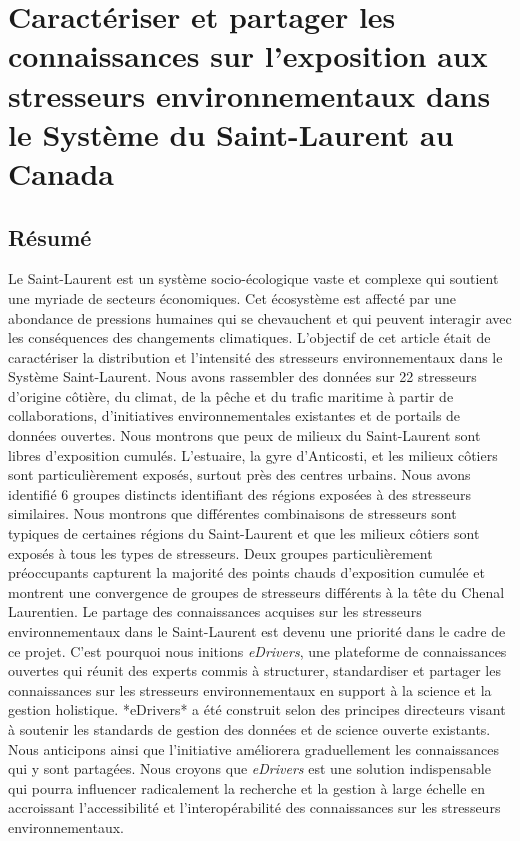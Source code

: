 \chapter{Caractériser et partager les connaissances sur l’exposition aux stresseurs environnementaux dans le Système du Saint-Laurent au Canada}
\label{chap4}

\section{Résumé}

Le Saint-Laurent est un système socio-écologique vaste et complexe qui soutient une myriade de secteurs économiques. Cet écosystème est affecté par une abondance de pressions humaines qui se chevauchent et qui peuvent interagir avec les conséquences des changements climatiques. L’objectif de cet article était de caractériser la distribution et l’intensité des stresseurs environnementaux dans le Système Saint-Laurent. Nous avons rassembler des données sur 22 stresseurs d’origine côtière, du climat, de la pêche et du trafic maritime à partir de collaborations, d’initiatives environnementales existantes et de portails de données ouvertes. Nous montrons que peux de milieux du Saint-Laurent sont libres d’exposition cumulés. L’estuaire, la gyre d’Anticosti, et les milieux côtiers sont particulièrement exposés, surtout près des centres urbains. Nous avons identifié 6 groupes distincts identifiant des régions exposées à des stresseurs similaires. Nous montrons que différentes combinaisons de stresseurs sont typiques de certaines régions du Saint-Laurent et que les milieux côtiers sont exposés à tous les types de stresseurs. Deux groupes particulièrement préoccupants capturent la majorité des points chauds d’exposition cumulée et montrent une convergence de groupes de stresseurs différents à la tête du Chenal Laurentien. Le partage des connaissances acquises sur les stresseurs environnementaux dans le Saint-Laurent est devenu une priorité dans le cadre de ce projet. C’est pourquoi nous initions \textit{eDrivers}, une plateforme de connaissances ouvertes qui réunit des experts commis à structurer, standardiser et partager les connaissances sur les stresseurs environnementaux en support à la science et la gestion holistique. *eDrivers* a été construit selon des principes directeurs visant à soutenir les standards de gestion des données et de science ouverte existants. Nous anticipons ainsi que l’initiative améliorera graduellement les connaissances qui y sont partagées. Nous croyons que \textit{eDrivers} est une solution indispensable qui pourra influencer radicalement la recherche et la gestion à large échelle en accroissant l’accessibilité et l’interopérabilité des connaissances sur les stresseurs environnementaux.

